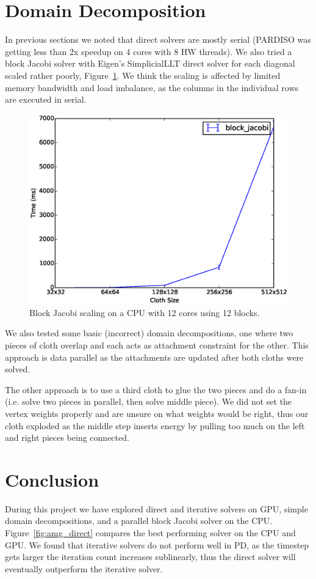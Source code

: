 \documentclass{article}
\begin{document}
\section{Domain Decomposition}
In previous sections we noted that direct solvers are mostly serial (PARDISO
was getting less than 2x speedup on 4 cores with 8 HW threads). We also tried
a block Jacobi solver with Eigen's SimplicialLLT direct solver for each diagonal
scaled rather poorly, Figure~\ref{fig:block_jacobi_scaling}. We think
the scaling is affected by limited memory bandwidth and load imbalance, as
the columns in the individual rows are executed in serial.


\begin{figure}[htb!]
	\centering
	\includegraphics[width=0.9\linewidth]{img/block_jacobi_scaling}
	\caption{Block Jacobi scaling on a CPU with 12 cores using 12 blocks.
	\label{fig:block_jacobi_scaling}}
\end{figure}

We also tested some basic (incorrect) domain decompositions, one where two
pieces of cloth overlap and each acts as attachment constraint for the other.
This approach is data parallel as the attachments are updated after both
cloths were solved.

The other approach is to use a third cloth to glue the two pieces and do a
fan-in (i.e. solve two pieces in parallel, then solve middle piece). We did
not set the vertex weights properly and are unsure on what weights would be right,
thus our cloth exploded as the middle step inserts energy by pulling too much on
the left and right pieces being connected.

\section{Conclusion}
During this project we have explored direct and iterative solvers on GPU,
simple domain decompositions, and a parallel block Jacobi solver on the CPU.
Figure~\ref{fig:amg_direct} compares the best performing solver on the CPU and
GPU. We found that iterative solvers do not perform well in PD, as the
timestep gets larger the iteration count increases sublinearly, thus the
direct solver will eventually outperform the iterative solver.
\end{document}

